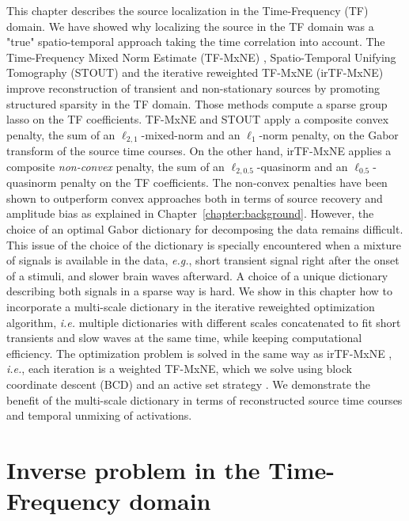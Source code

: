 This chapter describes the source localization in the Time-Frequency (TF) domain. We have showed why localizing the source in the TF domain was a "true" spatio-temporal approach taking the time correlation into account.
The Time-Frequency Mixed Norm Estimate (TF-MxNE) \cite{Alex13}, Spatio-Temporal Unifying Tomography (STOUT) \cite{castano2015solving} and the iterative reweighted TF-MxNE (irTF-MxNE) \cite{daniel15} improve reconstruction of transient and non-stationary sources by promoting structured sparsity in the TF domain. Those methods compute a sparse group lasso on the TF coefficients. TF-MxNE and STOUT apply a composite convex penalty, the sum of an $\ell_{2, 1}$-mixed-norm and an $\ell_{1}$-norm penalty, on the Gabor transform of the source time courses. On the other hand, irTF-MxNE applies a composite \emph{non-convex} penalty, the sum of an $\ell_{2, 0.5}$-quasinorm and an $\ell_{0.5}$-quasinorm penalty on the TF coefficients.
The non-convex penalties have been shown to outperform convex approaches both in terms of source recovery and amplitude bias \cite{candes2008enhancing,daubechies2010iteratively} as explained in Chapter~\ref{chapter:background}. However, the choice of an optimal Gabor dictionary for decomposing the data remains difficult.\\

This issue of the choice of the dictionary is specially encountered when a mixture of signals is available in the data, \textit{e.g.}, short transient signal right after the onset of a stimuli, and slower brain waves afterward. A choice of a unique dictionary describing both signals in a sparse way is hard. We show in this chapter how to incorporate a multi-scale dictionary in the iterative reweighted optimization algorithm, \textit{i.e.} multiple dictionaries with different scales concatenated to fit short transients and slow waves at the same time, while keeping computational efficiency. The optimization problem is solved in the same way as irTF-MxNE \cite{daniel15}, \textit{i.e.}, each iteration is a weighted TF-MxNE, which we solve using block coordinate descent (BCD) and an active set strategy \cite{friedman2010regularization}. %
We demonstrate the benefit of the multi-scale dictionary in terms of reconstructed source time courses and temporal unmixing of activations.

\section{Inverse problem in the Time-Frequency domain} \label{irtfmxne}

